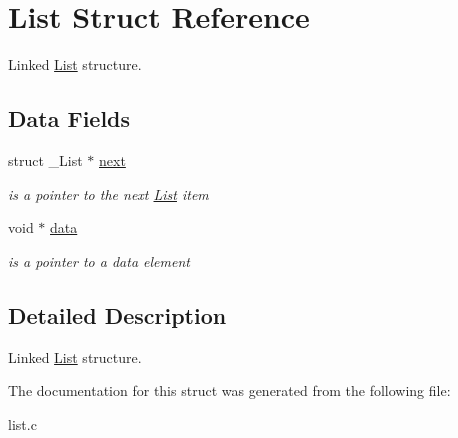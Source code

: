 \hypertarget{structList}{}\section{List Struct Reference}
\label{structList}


Linked \hyperlink{structList}{List} structure.  


\subsection*{Data Fields}
\begin{DoxyCompactItemize}
\item 
\mbox{\label{structList_a779836d7c608a7451395eae0cc4bade1}} 
struct \+\_\+\+List $\ast$ \hyperlink{structList_a779836d7c608a7451395eae0cc4bade1}{next}
\begin{DoxyCompactList}\small\item\em is a pointer to the next \hyperlink{structList}{List} item \end{DoxyCompactList}\item 
\mbox{\label{structList_a107142658762e45460f5d278247d8f3f}} 
void $\ast$ \hyperlink{structList_a107142658762e45460f5d278247d8f3f}{data}
\begin{DoxyCompactList}\small\item\em is a pointer to a data element \end{DoxyCompactList}\end{DoxyCompactItemize}


\subsection{Detailed Description}
Linked \hyperlink{structList}{List} structure. 

The documentation for this struct was generated from the following file\+:\begin{DoxyCompactItemize}
\item 
list.\+c\end{DoxyCompactItemize}
